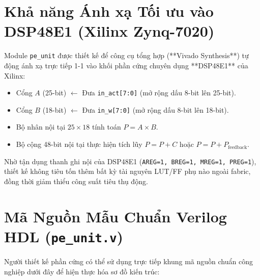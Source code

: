 \documentclass[11pt,a4paper]{article}
\begin{document}
\vspace{0.3cm}
\section{Khả năng Ánh xạ Tối ưu vào DSP48E1 (Xilinx Zynq-7020)}

Module \texttt{pe\_unit} được thiết kế để công cụ tổng hợp (**Vivado Synthesis**) tự động ánh xạ trực tiếp 1-1 vào khối phần cứng chuyên dụng **DSP48E1** của Xilinx:
\begin{itemize}
    \item Cổng $A$ (25-bit) $\leftarrow$ Đưa \texttt{in\_act[7:0]} (mở rộng dấu 8-bit lên 25-bit).
    \item Cổng $B$ (18-bit) $\leftarrow$ Đưa \texttt{in\_w[7:0]} (mở rộng dấu 8-bit lên 18-bit).
    \item Bộ nhân nội tại $25 \times 18$ tính toán $P = A \times B$.
    \item Bộ cộng 48-bit nội tại thực hiện tích lũy $P = P + C$ hoặc $P = P + P_{\text{feedback}}$.
\end{itemize}
Nhờ tận dụng thanh ghi nội của DSP48E1 (\texttt{AREG=1, BREG=1, MREG=1, PREG=1}), thiết kế không tiêu tốn thêm bất kỳ tài nguyên LUT/FF phụ nào ngoài fabric, đồng thời giảm thiểu công suất tiêu thụ động.

\vspace{0.5cm}
\section{Mã Nguồn Mẫu Chuẩn Verilog HDL (\texttt{pe\_unit.v})}

Người thiết kế phần cứng có thể sử dụng trực tiếp khung mã nguồn chuẩn công nghiệp dưới đây để hiện thực hóa sơ đồ kiến trúc:
\end{document}
